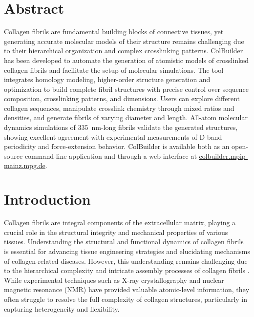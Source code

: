 \documentclass[10pt,letterpaper]{article}
\begin{document}
\section*{Abstract}
Collagen fibrils are fundamental building blocks of connective tissues, yet generating accurate molecular models of their structure remains challenging due to their hierarchical organization and complex crosslinking patterns. ColBuilder has been developed to automate the generation of atomistic models of crosslinked collagen fibrils and facilitate the setup of molecular simulations. The tool integrates homology modeling, higher-order structure generation and optimization to build complete fibril structures with precise control over sequence composition, crosslinking patterns, and dimensions. Users can explore different collagen sequences, manipulate crosslink chemistry through mixed ratios and densities, and generate fibrils of varying diameter and length. All-atom molecular dynamics simulations of \SI{335}{\nano\meter}-long fibrils validate the generated structures, showing excellent agreement with experimental measurements of D-band periodicity and force-extension behavior. ColBuilder is available both as an open-source command-line application and through a web interface at \href{https://colbuilder.mpip-mainz.mpg.de}{colbuilder.mpip-mainz.mpg.de}.


\section*{Introduction}

Collagen fibrils are integral components of the extracellular matrix, playing a crucial role in the structural integrity and mechanical properties of various tissues. Understanding the structural and functional dynamics of collagen fibrils is essential for advancing tissue engineering strategies and elucidating mechanisms of collagen-related diseases. However, this understanding remains challenging due to the hierarchical complexity and intricate assembly processes of collagen fibrils \cite{kadler1996collagen, shoulders2009collagen}. While experimental techniques such as X-ray crystallography \cite{orgel2006microfibrillar} and nuclear magnetic resonance (NMR) \cite{jelinski19802h, peixoto2013solid} have provided valuable atomic-level information, they often struggle to resolve the full complexity of collagen structures, particularly in capturing heterogeneity and flexibility.
\end{document}
